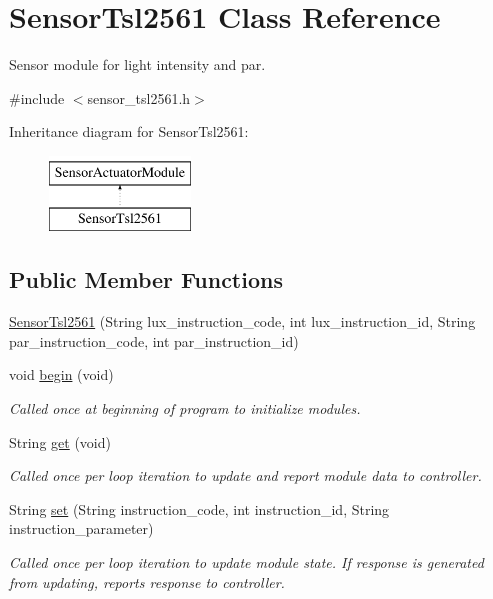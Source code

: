 \hypertarget{class_sensor_tsl2561}{}\section{Sensor\+Tsl2561 Class Reference}
\label{class_sensor_tsl2561}


Sensor module for light intensity and par.  




{\ttfamily \#include $<$sensor\+\_\+tsl2561.\+h$>$}

Inheritance diagram for Sensor\+Tsl2561\+:\begin{figure}[H]
\begin{center}
\leavevmode
\includegraphics[height=2.000000cm]{class_sensor_tsl2561}
\end{center}
\end{figure}
\subsection*{Public Member Functions}
\begin{DoxyCompactItemize}
\item 
\hyperlink{class_sensor_tsl2561_acb66b0b6127d1d889ff31085dbb9d8c2}{Sensor\+Tsl2561} (String lux\+\_\+instruction\+\_\+code, int lux\+\_\+instruction\+\_\+id, String par\+\_\+instruction\+\_\+code, int par\+\_\+instruction\+\_\+id)
\item 
void \hyperlink{class_sensor_tsl2561_ace17c892222366185df021bda708cc10}{begin} (void)
\begin{DoxyCompactList}\small\item\em Called once at beginning of program to initialize modules. \end{DoxyCompactList}\item 
String \hyperlink{class_sensor_tsl2561_a1d9dff52af755218abca50f9025f0f5c}{get} (void)
\begin{DoxyCompactList}\small\item\em Called once per loop iteration to update and report module data to controller. \end{DoxyCompactList}\item 
String \hyperlink{class_sensor_tsl2561_ab4eb3d8197c96867f43857876df46b33}{set} (String instruction\+\_\+code, int instruction\+\_\+id, String instruction\+\_\+parameter)
\begin{DoxyCompactList}\small\item\em Called once per loop iteration to update module state. If response is generated from updating, reports response to controller. \end{DoxyCompactList}\end{DoxyCompactItemize}
